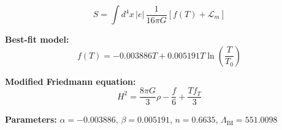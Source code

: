 
\begin{equation}
  S = \int d^4x \, |e| \, \frac{1}{16\pi G} \left[ f(T) + \mathcal{L}_m \right]
\end{equation}

\textbf{Best-fit model:}
\begin{equation}
  f(T) = -0.003886 T + 0.005191 T \ln\!\left(\frac{T}{T_0}\right)
\end{equation}

\textbf{Modified Friedmann equation:}
\begin{equation}
  H^2 = \frac{8\pi G}{3} \rho - \frac{f}{6} + \frac{T f_T}{3}
\end{equation}

\textbf{Parameters:}
$\alpha = -0.003886$, \quad
$\beta = 0.005191$, \quad
$n = 0.6635$, \quad
$\Lambda_{\text{BI}} = 551.0098$